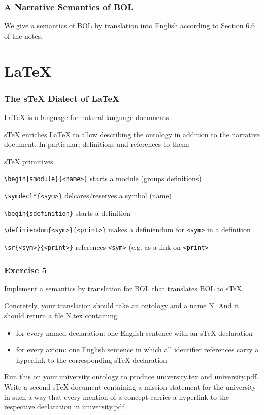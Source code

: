 \begin{frame}\frametitle{A Narrative Semantics of BOL}
We give a semantics of BOL by translation into English according to Section 6.6 of the notes.
\end{frame}

\section{LaTeX}

\begin{frame}[fragile]\frametitle{The sTeX Dialect of LaTeX}
  \lstset{language=[LaTeX]TeX}
LaTeX is a language for natural language documents.

sTeX enriches LaTeX to allow describing the ontology in addition to the narrative document.
In particular: definitions and references to them:

\begin{blockitems}{sTeX primitives}
\item \lstinline|\begin{smodule}{<name>}| starts a module (groups definitions)
\item \lstinline|\symdecl*{<sym>}| delcares/reserves a symbol (name)
\item \lstinline|\begin{sdefinition}| starts a definition
\item \lstinline|\definiendum{<sym>}{<print>}| makes a definiendum for \lstinline|<sym>|
  in a definition 
\item \lstinline|\sr{<sym>}{<print>}| references \lstinline|<sym>| (e.g. as a link on
  \lstinline|<print>|
\end{blockitems}
\end{frame}

%    
%    

\begin{frame}\frametitle{Exercise 5}
Implement a semantics by translation for BOL that translates BOL to sTeX.

Concretely, your translation should take an ontology and a name N.
And it should return a file N.tex containing
\begin{itemize}
 \item for every named declaration: one English sentence with an sTeX declaration
 \item for every axiom: one English sentence in which all identifier references carry a hyperlink to the corresponding sTeX declaration
\end{itemize}

Run this on your university ontology to produce university.tex and university.pdf.
Write a second sTeX document containing a mission statement for the university in such a way that every mention of a concept carries a hyperlink to the respective declaration in university.pdf.
\end{frame}
